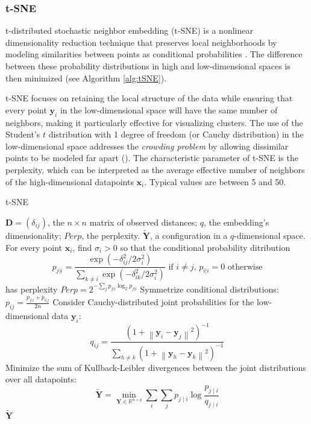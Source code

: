 \subsubsection{t-SNE}

t-distributed stochastic neighbor embedding (t-SNE) is a nonlinear dimensionality reduction technique that preserves local neighborhoods by modeling similarities between points as conditional probabilities \citep{Vandermaaten2008}. The difference between these probability distributions in high and low-dimensional spaces is then minimized (see Algorithm \ref{alg:tSNE}).

t-SNE focuses on retaining the local structure of the data while ensuring that every point $\mathbf{y}_i$ in the low-dimensional space will have the same number of neighbors, making it particularly effective for visualizing clusters. The use of the Student's $t$ distribution with 1 degree of freedom (or Cauchy distribution) in the low-dimensional space addresses the \textit{crowding problem} by allowing dissimilar points to be modeled far apart (\cite{Vandermaaten2008}). The characteristic parameter of t-SNE is the perplexity, which can be interpreted as the average effective number of neighbors of the high-dimensional datapoints $\mathbf{x}_i$. Typical values are between 5 and 50.

\begin{algorithm}
    \caption{t-SNE}
    \label{alg:tSNE}
    
    \begin{algorithmic}[1]
    \REQUIRE $\mathbf{D} = (\delta_{ij})$, the $n \times n$ matrix of observed distances; $q$, the embedding's dimensionality; $Perp$, the perplexity.
    \ENSURE $\mathbf{\tilde{Y}}$, a configuration in a $q$-dimensional space.
    \STATE For every point $\mathbf{x}_i$, find $\sigma_i > 0$ so that the conditional probability ditribution
        $$
        p_{j|i} = \frac{\exp(-\delta_{ij}^2/2\sigma_i^2)}{\sum_{k \neq i}\exp(-\delta_{ik}^2/2\sigma_i^2)}\text{ if } i \neq j, \, p_{i|i} = 0 \text{ otherwise}
        $$ has perplexity $ Perp = 2^{-\sum_{j} p_{j|i} \log_2 p_{j|i}} $
    \STATE Symmetrize conditional distributions: $p_{ij} = \frac{p_{j|i} + p_{i|j}}{2n}$
    \STATE Consider Cauchy-distributed joint probabilities for the low-dimensional data $\mathbf{y}_i$: $$q_{ij} = \frac{(1 + \left\|\mathbf{y}_i-\mathbf{y}_j\right\|^2)^{-1}}{\sum_{h \neq k}(1 + \left\|\mathbf{y}_h-\mathbf{y}_k\right\|^2)^{-1}}$$
    \STATE Minimize the sum of Kullback-Leibler divergences between the joint distributions over all datapoints: $$
    \mathbf{\tilde{Y}} = \min_{\mathbf{Y} \in \mathbb{R}^{n\times q}} \sum_i \sum_j p_{j \mid i} \log \frac{p_{j \mid i}}{q_{j \mid i}}
    $$
    \RETURN $\mathbf{\tilde{Y}}$
    
    \end{algorithmic}
\end{algorithm}

